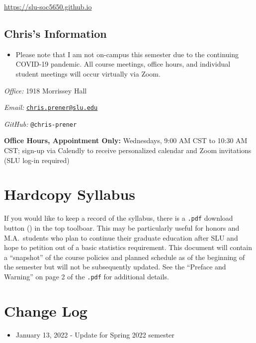 \documentclass[
]{book}
\providecommand{\tightlist}{%
  \setlength{\itemsep}{0pt}\setlength{\parskip}{0pt}}
\newenvironment{rmdblock}[1]
  {\begin{shaded*}
  \begin{itemize}
  \renewcommand{\labelitemi}{
    \raisebox{-.7\height}[0pt][0pt]{
      {\setkeys{Gin}{width=3em,keepaspectratio}\texttt{[image: images/\#1]}}
    }
  }
  \item
  }
  {
  \end{itemize}
  \end{shaded*}
  }
\newenvironment{rmdwarning}
  {\begin{rmdblock}{warning}}
  {\end{rmdblock}}
\begin{document}
\url{https://slu-soc5650.github.io}

\hypertarget{chriss-information}{%
\subsection*{Chris's Information}\label{chriss-information}}

\begin{rmdwarning}
Please note that I am not on-campus this semester due to the continuing
COVID-19 pandemic. All course meetings, office hours, and individual
student meetings will occur virtually via Zoom.
\end{rmdwarning}

\emph{Office:} 1918 Morrissey Hall

\emph{Email:} \href{mailto:chris.prener@slu.edu}{\nolinkurl{chris.prener@slu.edu}}

\emph{GitHub:} \texttt{@chris-prener}

\textbf{Office Hours, Appointment Only:} Wednesdays, 9:00 AM CST to 10:30 AM CST; sign-up via Calendly to receive personalized calendar and Zoom invitations (SLU log-in required)

\hypertarget{hardcopy-syllabus}{%
\section*{Hardcopy Syllabus}\label{hardcopy-syllabus}}

If you would like to keep a record of the syllabus, there is a \texttt{.pdf} download button () in the top toolboar. This may be particularly useful for honors and M.A.~students who plan to continue their graduate education after SLU and hope to petition out of a basic statistics requirement. This document will contain a ``snapshot'' of the course policies and planned schedule as of the beginning of the semester but will not be subsequently updated. See the ``Preface and Warning'' on page 2 of the \texttt{.pdf} for additional details.

\hypertarget{change-log}{%
\section*{Change Log}\label{change-log}}

\begin{itemize}
\tightlist
\item
  January 13, 2022 - Update for Spring 2022 semester
\end{itemize}
\end{document}
